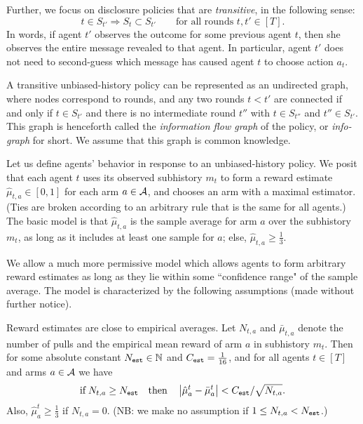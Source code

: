 Further, we focus on disclosure policies that are \emph{transitive}, in the following sense:
\[ t\in S_{t'} \Rightarrow S_t\subset S_{t'}
    \qquad \text{for all rounds $t,t'\in [T]$}. \]
In words, if agent $t'$ observes the outcome for some previous agent $t$, then she observes the entire message revealed to that agent. In particular, agent $t'$ does not need to second-guess which message has caused agent $t$ to choose action $a_t$.

A transitive unbiased-history policy can be represented as an undirected graph, where nodes correspond to rounds, and any two rounds $t<t'$ are connected if and only if $t\in S_{t'}$ and there is no intermediate round $t''$ with
    $t\in S_{t''}$ and $t''\in S_{t'}$.
This graph is henceforth called the \emph{information flow graph} of the policy, or \emph{info-graph} for short. We assume that this graph is common knowledge.

 Let us define agents' behavior in response to an unbiased-history policy. We posit that each agent $t$ uses its observed subhistory $m_t$ to form a reward estimate $\hat{\mu}_{t,a} \in [0,1]$ for each arm $a\in \mathcal{A}$, and chooses an arm with a maximal estimator. (Ties are broken according to an arbitrary rule that is the same for all agents.) The basic model is that $\hat{\mu}_{t,a}$ is the sample average for arm $a$ over the subhistory $m_t$, as long as it includes at least one sample for $a$; else, $\hat{\mu}_{t,a}\geq \tfrac13$.

We allow a much more permissive model which allows agents to form arbitrary reward estimates as long as they lie within some ``confidence range" of the sample average. The model is characterized by the following assumptions (made without further notice).


\begin{assumption}\label{ass:embehave}
Reward estimates are close to empirical averages. Let $N_{t,a}$ and $\bar{\mu}_{t,a}$ denote the number of pulls and the empirical mean reward of arm $a$ in subhistory $m_t$. Then for some absolute constant $N_{\mathtt{est}}\in \mathbb{N}$ and $C_{\mathtt{est}}=\tfrac{1}{16}$, and for all agents $t\in [T]$ and arms $a\in\mathcal{A}$ we have
\[
\text{if}\; N_{t,a} \geq N_{\mathtt{est}}
\quad\text{then}\quad
    \left|\hat{\mu}^t_a - \bar{\mu}^t_a \right| <
		C_{\mathtt{est}}/\sqrt{N_{t,a}}.
\]
Also,
    $\hat{\mu}^t_a\geq\tfrac13$ if $N_{t,a}=0$.
(NB: we make no assumption if $1\leq N_{t,a}<N_{\mathtt{est}}$.)
\end{assumption}


